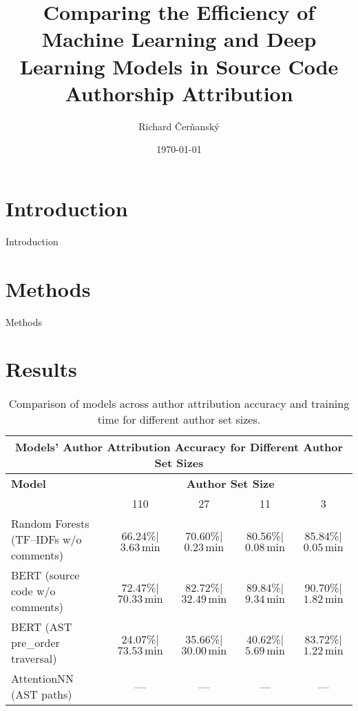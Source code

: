 \documentclass{article}
\title{Comparing the Efficiency of Machine Learning and Deep Learning Models in Source Code Authorship Attribution}
\author{Richard Čerňanský}
\date{\today}
\begin{document}
\maketitle

\begin{abstract}
\end{abstract}

\section{Introduction}
Introduction


\section{Methods}
Methods

\section{Results}


\begin{table}[h!]
    \centering
    {\scriptsize
    \begin{tabular}{lcccc}
    \hline
    \multicolumn{5}{c}{\textbf{Models' Author Attribution Accuracy for Different Author Set Sizes}} \\
    \hline
    \textbf{Model} & \multicolumn{4}{c}{\textbf{Author Set Size}} \\
    \cline{2-5}
                  & 110  & 27  & 11 & 3 \\ 
    \hline
    Random Forests (TF--IDFs w/o comments) & 66.24\%\;|\;$3.63\,\mathrm{min}$ & 70.60\%\;|\;$0.23\,\mathrm{min}$ & 80.56\%\;|\;$0.08\,\mathrm{min}$ & 85.84\%\;|\;$0.05\,\mathrm{min}$ \\
    BERT (source code w/o comments)        & 72.47\%\;|\;$70.33\,\mathrm{min}$ & 82.72\%\;|\;$32.49\,\mathrm{min}$ & 89.84\%\;|\;$9.34\,\mathrm{min}$  & 90.70\%\;|\;$1.82\,\mathrm{min}$ \\
    BERT (AST pre\_order traversal)        & 24.07\%\;|\;$73.53\,\mathrm{min}$ & 35.66\%\;|\;$30.00\,\mathrm{min}$ & 40.62\%\;|\;$5.69\,\mathrm{min}$  & 83.72\%\;|\;$1.22\,\mathrm{min}$ \\
    AttentionNN (AST paths)              & --- & --- & --- & --- \\
    \hline
    \end{tabular}
    }
    \caption{Comparison of models across author attribution accuracy and training time for different author set sizes.}
    \label{tab:comparison}
\end{table}
\end{document}
